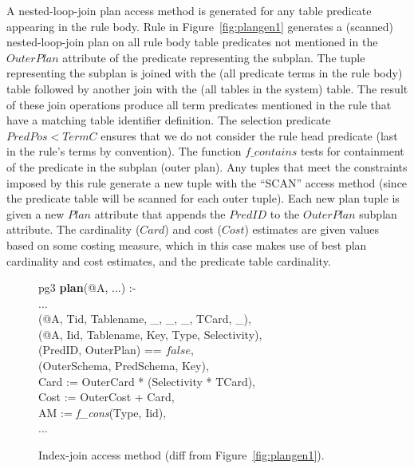 A nested-loop-join plan access method is generated for any table predicate appearing
in the rule body. Rule  in Figure~\ref{fig:plangen1} generates a
(scanned) nested-loop-join 
plan on all rule body table predicates not mentioned in the $OuterPlan$ attribute of the 
predicate representing the subplan. The  tuple representing the subplan is joined with 
the  (all predicate terms in the rule body) table followed by another join with 
the  (all tables in the system) table. The result of these join operations produce all 
term predicates mentioned in the rule that have a matching table identifier definition. 
The selection predicate $PredPos < TermC$ ensures that we do not
consider the rule head predicate (last in the rule's terms by
convention). The function $f\_contains$ tests for containment of the predicate in the subplan (outer plan). 
Any tuples that meet the constraints imposed by this rule generate a new  
tuple with the ``SCAN'' access method (since the predicate table will be scanned for each outer tuple). 
Each new plan tuple is given a new $Plan$ attribute that appends the $PredID$ to the $OuterPlan$ 
subplan attribute. 
The cardinality ($Card$) and cost ($Cost$) estimates are given values based on some costing 
measure, which in this case makes use of best plan cardinality and cost estimates, and the predicate 
table cardinality.

\begin{figure}
\ssp
\centering
\begin{boxedminipage}{\linewidth}
pg3 {\small \bf plan}(@A, ...) :-\\
\datalogspace ...\\
(@A, Tid, Tablename, \_, \_, \_, TCard, \_),\\
(@A, Iid, Tablename, Key, Type, Selectivity),\\
(PredID, OuterPlan) == $false$,\\
(OuterSchema, PredSchema, Key),\\
\datalogspace Card   := OuterCard * (Selectivity * TCard),\\
\datalogspace Cost   := OuterCost + Card,\\
\datalogspace AM := {\em f\_cons}(Type, Iid),\\
\datalogspace ...
\end{boxedminipage}
\caption{\label{fig:plangen2}Index-join access method (diff from Figure~\ref{fig:plangen1}).}
\end{figure}

